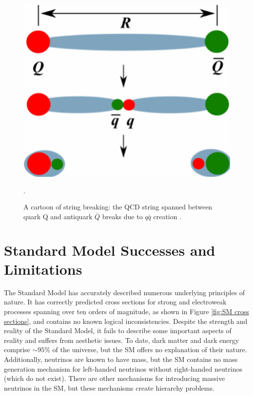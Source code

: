 \begin{figure}[h!]
  \centering
  \includegraphics[width=\hsize]{figures/Theory/color_string.pdf}
  \caption{A cartoon of string breaking: the QCD string spanned between quark Q and antiquark $\bar{Q}$ breaks due to $q\bar{q}$ creation \cite{colorstring}.}.
  \label{fig:colorstring}
\end{figure}
\FloatBarrier

\chapter{Standard Model Successes and Limitations}
The Standard Model has accurately described numerous underlying principles of nature. It has correctly predicted cross sections for strong and electroweak processes spanning over ten orders of magnitude, as shown in Figure \ref{fig:SM cross sections}, and contains no known logical inconsistencies. Despite the strength and reality of the Standard Model, it fails to describe some important aspects of reality and suffers from aesthetic issues. 
To date, dark matter and dark energy comprise $\sim 95\%$ of the universe, but the SM offers no explanation of their nature. Additionally, neutrinos are known to have mass, but the SM contains no mass generation mechanism for left-handed neutrinos without right-handed neutrinos (which do not exist). There are other mechanisms for introducing massive neutrinos in the SM, but these mechanisms create hierarchy problems. 

